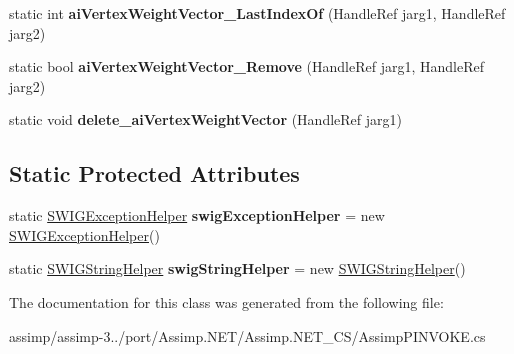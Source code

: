 \begin{DoxyCompactItemize}
\item 
\hypertarget{class_assimp_p_i_n_v_o_k_e_a33bf8d4af0e9f00859a23d6ccb06658b}{static int {\bfseries ai\+Vertex\+Weight\+Vector\+\_\+\+Last\+Index\+Of} (Handle\+Ref jarg1, Handle\+Ref jarg2)}\label{class_assimp_p_i_n_v_o_k_e_a33bf8d4af0e9f00859a23d6ccb06658b}

\item 
\hypertarget{class_assimp_p_i_n_v_o_k_e_ac39c72dfae4a7973e80d5c7f1b54660e}{static bool {\bfseries ai\+Vertex\+Weight\+Vector\+\_\+\+Remove} (Handle\+Ref jarg1, Handle\+Ref jarg2)}\label{class_assimp_p_i_n_v_o_k_e_ac39c72dfae4a7973e80d5c7f1b54660e}

\item 
\hypertarget{class_assimp_p_i_n_v_o_k_e_ac8eef03db3b52db3b25ea5437f749c93}{static void {\bfseries delete\+\_\+ai\+Vertex\+Weight\+Vector} (Handle\+Ref jarg1)}\label{class_assimp_p_i_n_v_o_k_e_ac8eef03db3b52db3b25ea5437f749c93}

\end{DoxyCompactItemize}
\subsection*{Static Protected Attributes}
\begin{DoxyCompactItemize}
\item 
\hypertarget{class_assimp_p_i_n_v_o_k_e_aef576792430c6d4ecb635a8e43684f9b}{static \hyperlink{class_assimp_p_i_n_v_o_k_e_1_1_s_w_i_g_exception_helper}{S\+W\+I\+G\+Exception\+Helper} {\bfseries swig\+Exception\+Helper} = new \hyperlink{class_assimp_p_i_n_v_o_k_e_1_1_s_w_i_g_exception_helper}{S\+W\+I\+G\+Exception\+Helper}()}\label{class_assimp_p_i_n_v_o_k_e_aef576792430c6d4ecb635a8e43684f9b}

\item 
\hypertarget{class_assimp_p_i_n_v_o_k_e_a1c93bb6c2f7960541ccc3a689851224a}{static \hyperlink{class_assimp_p_i_n_v_o_k_e_1_1_s_w_i_g_string_helper}{S\+W\+I\+G\+String\+Helper} {\bfseries swig\+String\+Helper} = new \hyperlink{class_assimp_p_i_n_v_o_k_e_1_1_s_w_i_g_string_helper}{S\+W\+I\+G\+String\+Helper}()}\label{class_assimp_p_i_n_v_o_k_e_a1c93bb6c2f7960541ccc3a689851224a}

\end{DoxyCompactItemize}


The documentation for this class was generated from the following file\+:\begin{DoxyCompactItemize}
\item 
assimp/assimp-\/3../port/\+Assimp.\+N\+E\+T/\+Assimp.\+N\+E\+T\+\_\+\+C\+S/Assimp\+P\+I\+N\+V\+O\+K\+E.\+cs\end{DoxyCompactItemize}
